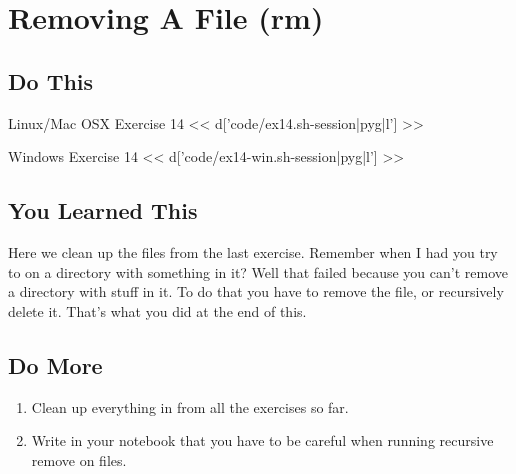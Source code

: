 \chapter{Removing A File (rm)}

\section{Do This}

\begin{code}{Linux/Mac OSX Exercise 14}
<< d['code/ex14.sh-session|pyg|l'] >>
\end{code}

\begin{code}{Windows Exercise 14}
<< d['code/ex14-win.sh-session|pyg|l'] >>
\end{code}

\section{You Learned This}

Here we clean up the files from the last exercise.  Remember when I had you
try to  on a directory with something in it?  Well that failed
because you can't remove a directory with stuff in it.  To do that you have
to remove the file, or recursively delete it.  That's what you did at the
end of this.

\section{Do More}

\begin{enumerate}
\item Clean up everything in  from all the exercises so far.
\item Write in your notebook that you have to be careful when running recursive
    remove on files.
\end{enumerate}

